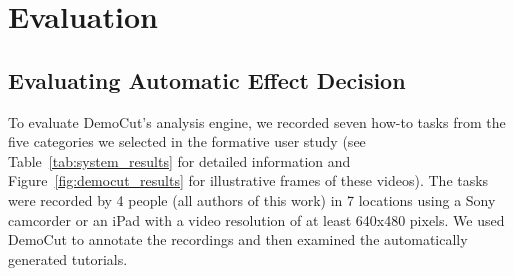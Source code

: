 \section{Evaluation}

\subsection{Evaluating Automatic Effect Decision}

To evaluate DemoCut's analysis engine, we recorded seven how-to tasks
from the five categories we selected in the formative user study
(see Table~\ref{tab:system_results} for detailed information and Figure~\ref{fig:democut_results} for illustrative frames of these videos).
%
The tasks were recorded by 4 people (all authors of this
work) in 7 locations using a Sony camcorder or an iPad with
a video resolution of at least 640x480 pixels.
%
We used DemoCut to annotate the recordings and then examined the
automatically generated tutorials.

